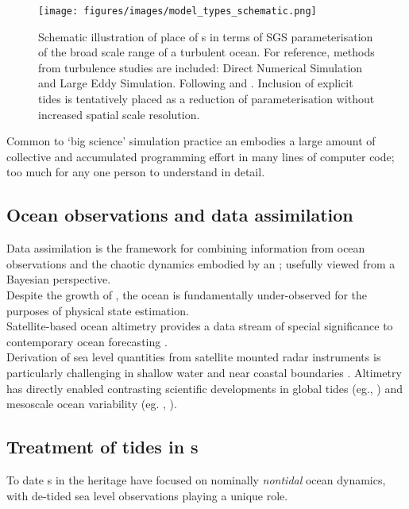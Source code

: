 \begin{figure}[h]\centering
  \texttt{[image: figures/images/model\_types\_schematic.png]}
  \caption{Schematic illustration of place of \OGCM{}s in terms of SGS parameterisation of the broad scale range of a turbulent ocean.  For reference, methods from turbulence studies are included: Direct Numerical Simulation and Large Eddy Simulation. Following \citep[fig 5.2]{Petersen:2012tr} and \citep{Stevens:2001kb}.  Inclusion of explicit tides is tentatively placed as a reduction of parameterisation without increased spatial scale resolution.}
  \label{fig:models}
\end{figure}

Common to `big science' simulation practice \citep{Petersen:2012tr} an \OGCM{} embodies a large amount of collective and accumulated programming effort in many lines of computer code; too much for any one person to understand in detail. \\



\subsection{Ocean observations and data assimilation}
Data assimilation is the framework for combining information from ocean observations and the chaotic dynamics embodied by an \OGCM{}; usefully viewed from a Bayesian perspective\citep{Zaron:2011ft}.\\
Despite the growth of \GOOS{} \citep{Komen:1999ch}, the ocean is fundamentally under-observed for the purposes of physical state estimation.\\


Satellite-based ocean altimetry provides a data stream of special significance to contemporary ocean forecasting \citep{Fu:2001ub}. \\
Derivation of sea level quantities from satellite mounted radar instruments is particularly challenging in shallow water and near coastal boundaries \citep{Woodworth:2011bf}. 
Altimetry has directly enabled contrasting scientific developments in global tides (eg.\citet{Egbert:1996vr},  \citet{Lefevre:2011dg}) and mesoscale ocean variability (eg.  \citet{Wunsch:1998bq}, \citet{Chelton:vi}).

 
\subsection{Treatment of tides in \OGCM{}s}
\label{S:tides_ogcm}
To date \OGCM{}s in the \GODAE{} heritage have focused on nominally \emph{nontidal} ocean dynamics, with de-tided sea level observations playing a unique role.\\


